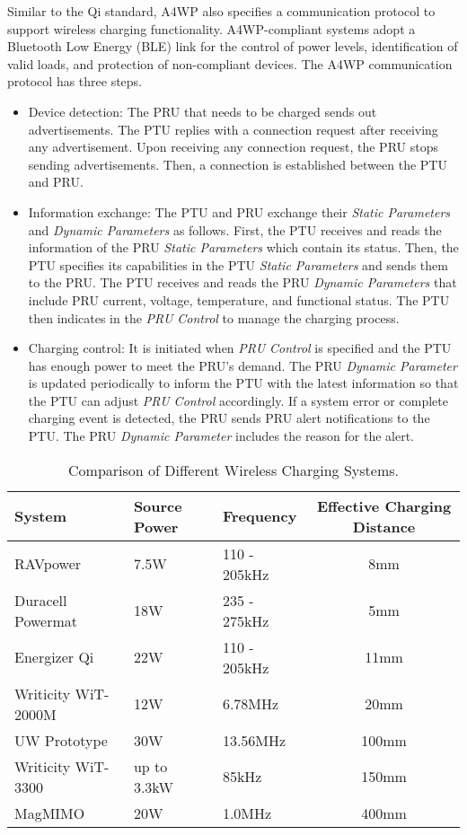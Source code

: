 \documentclass[twocolumn,10pt]{IEEEtran}
\begin{document}
Similar to the Qi standard, A4WP also specifies a communication protocol to support wireless charging functionality. A4WP-compliant systems adopt a Bluetooth Low Energy (BLE) link for the control of power levels, identification of valid loads, and protection of non-compliant devices. The A4WP communication protocol has three steps.
\begin{itemize}
\item Device detection: The PRU that needs to be charged sends out advertisements. The PTU replies with a connection request after receiving any advertisement. Upon receiving any connection request, the PRU stops sending advertisements. Then, a connection is established between the PTU and PRU. 

\item Information exchange: The PTU and PRU exchange their {\em Static Parameters} and {\em Dynamic Parameters} as follows. First, the PTU receives and reads the information of the PRU {\em Static Parameters} which contain its status. Then, the PTU specifies its capabilities in the PTU {\em Static Parameters} and sends them to the PRU. The PTU receives and reads the PRU {\em Dynamic Parameters} that include PRU current, voltage, temperature, and functional status. The PTU then indicates in the {\em PRU Control} to manage the charging process.

\item Charging control: It is initiated when {\em PRU Control} is specified and the PTU has enough power to meet the PRU's demand. The PRU {\em Dynamic Parameter} is updated periodically to inform the PTU with the latest information so that the PTU can adjust {\em PRU Control} accordingly. If a system error or complete charging event is detected, the PRU sends PRU alert notifications to the PTU. The PRU {\em Dynamic Parameter} includes the reason for the alert.
\end{itemize}
 
\begin{table*}\small \centering
\caption{\footnotesize Comparison of Different Wireless Charging Systems.} \label{WPT_systems}
\begin{tabular}{|l|l|l|c|}
\hline
\footnotesize {\bf System} & {\bf Source Power } & {\bf Frequency} & {\bf Effective Charging Distance}  \\ 
\hline
\hline
 RAVpower \cite{RAVPower} &  7.5W & 110 - 205kHz  &  8mm  \\
\hline
 Duracell Powermat \cite{Duracell2011} & 18W & 235 - 275kHz &  5mm \\
\hline
 Energizer Qi \cite{Energizer} &  22W & 110 - 205kHz &  11mm  \\
\hline
 Writicity WiT-2000M  \cite{WitricityCorp2000M}   & 12W &  6.78MHz &  20mm \\
\hline
  UW Prototype   \cite{P.2013Sample}  & 30W &  13.56MHz &   100mm \\
 \hline
 Writicity WiT-3300   \cite{WitricityCorp3300} & up to 3.3kW & 85kHz  & 150mm  \\
\hline
 MagMIMO  \cite{J.2014Jadidian}  & 20W &  1.0MHz &  400mm \\ 
\hline  
\end{tabular}
\end{table*} 
 
\end{document}
